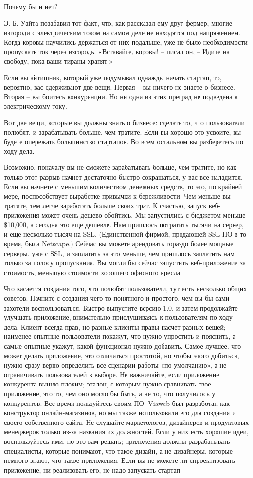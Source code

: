 \documentclass[ebook,12pt,oneside,openany]{memoir}
\begin{document}
Почему бы и нет?

Э. Б. Уайта позабавил тот факт, что, как рассказал ему друг-фермер,
многие изгороди с электрическим током на самом деле не находятся под
напряжением. Когда коровы научились держаться от них подальше, уже не
было необходимости пропускать ток через изгородь. «Вставайте, коровы!
– писал он, – Идите на свободу, пока ваши тираны храпят!»

Если вы айтишник, который уже подумывал однажды начать стартап, то,
вероятно, вас сдерживают две вещи. Первая – вы ничего не знаете о
бизнесе. Вторая – вы боитесь конкуренции. Но ни одна из этих преград
не подведена к электрическому току.

Вот две вещи, которые вы должны знать о бизнесе: сделать то, что
пользователи полюбят, и зарабатывать больше, чем тратите. Если вы
хорошо это усвоите, вы будете опережать большинство стартапов. Во всем
остальном вы разберетесь по ходу дела.

Возможно, поначалу вы не сможете зарабатывать больше, чем тратите, но
как только этот разрыв начнет достаточно быстро сокращаться, у вас все
наладится. Если вы начнете с меньшим количеством денежных средств, то
это, по крайней мере, поспособствует выработке привычки к
бережливости. Чем меньше вы тратите, тем легче заработать больше своих
трат. К счастью, запуск веб-приложения может очень дешево обойтись. Мы
запустились с бюджетом меньше \$10,000, а сегодня это еще дешевле. Нам
пришлось потратить тысячи на сервер, и еще несколько тысяч на SSL.
(Единственной фирмой, продающей SSL ПО в то время, была Netscape.)
Сейчас вы можете арендовать гораздо более мощные серверы, уже с SSL, и
заплатить за это меньше, чем пришлось заплатить нам только за полосу
пропускания. Вы могли бы сейчас запустить веб-приложение за стоимость,
меньшую стоимости хорошего офисного кресла.

Что касается создания того, что полюбят пользователи, тут есть
несколько общих советов. Начните с создания чего-то понятного и
простого, чем вы бы сами захотели воспользоваться. Быстро выпустите
версию 1.0, и затем продолжайте улучшать приложение, внимательно
прислушиваясь к пользователям по ходу дела. Клиент всегда прав, но
разные клиенты правы насчет разных вещей; наименее опытные
пользователи покажут, что нужно упростить и пояснить, а самые опытные
укажут, какой функционал нужно добавить. Самое лучшее, что может
делать приложение, это отличаться простотой, но чтобы этого добиться,
нужно сразу верно определить все сценарии работы «по умолчанию», а не
ограничивать пользователей в выборе. Не важничайте, если приложение
конкурента вышло плохим; эталон, с которым нужно сравнивать свое
приложение, это то, чем оно могло бы быть, а не то, что получилось у
конкурентов. Все время пользуйтесь своим ПО. Viaweb был разработан как
конструктор онлайн-магазинов, но мы также использовали его для
создания и своего собственного сайта. Не слушайте маркетологов,
дизайнеров и продуктовых менеджеров только из-за названия их
должностей. Если у них есть хорошие идеи, воспользуйтесь ими, но это
вам решать; приложения должны разрабатывать специалисты, которые
понимают, что такое дизайн, а не дизайнеры, которые немного знают, что
такое приложения. Если вы не можете ни спроектировать приложение, ни
реализовать его, не надо запускать стартап.
\end{document}
